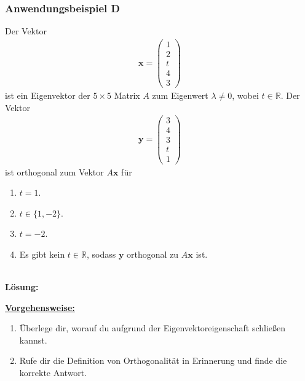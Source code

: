 \subsubsection*{Anwendungsbeispiel D}
Der Vektor
\begin{align*}
\textbf{x}
=
\begin{pmatrix}
1\\
2\\
t\\
4\\
3
\end{pmatrix}
\end{align*}
ist ein Eigenvektor der $5 \times 5$ Matrix $A$ zum Eigenwert $\lambda \neq 0$, wobei $t \in \mathbb{R}$.
Der Vektor
\begin{align*}
\textbf{y}
= 
\begin{pmatrix}
3\\
4\\
3\\
t\\ 
1
\end{pmatrix}
\end{align*}
ist orthogonal zum Vektor $A \textbf{x}$ für
\renewcommand{\labelenumi}{(\alph{enumi})}
\begin{enumerate}
\item 
$t = 1$.
\item
$t \in \lbrace 1, -2 \rbrace$.
\item
$t = -2$.
\item
Es gibt kein $t \in \mathbb{R}$, sodass $\textbf{y}$ orthogonal zu $A \textbf{x} $ ist.
\end{enumerate}
\ \\
\textbf{Lösung:}
\begin{mdframed}
\underline{\textbf{Vorgehensweise:}}
\renewcommand{\labelenumi}{\theenumi.}
\begin{enumerate}
\item Überlege dir, worauf du aufgrund der Eigenvektoreigenschaft schließen kannst.
\item 
Rufe dir die Definition von Orthogonalität in Erinnerung und finde die korrekte Antwort.
\end{enumerate}
\end{mdframed}

